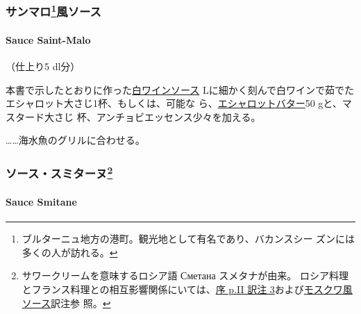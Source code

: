 \begin{recette}
\hypertarget{ux30b5ux30f3ux30deux30ed126ux98a8ux30bdux30fcux30b9}{%
\subsubsection[サンマロ風ソース]{\texorpdfstring{サンマロ\footnote{ブルターニュ地方の港町。観光地として有名であり、バカンスシー
  ズンには多くの人が訪れる。}風ソース}{サンマロ風ソース}}\label{ux30b5ux30f3ux30deux30ed126ux98a8ux30bdux30fcux30b9}}

\hypertarget{sauce-saint-malo}{%
\paragraph{Sauce Saint-Malo}\label{sauce-saint-malo}}


（仕上り5 dl分）

本書で示したとおりに作った\protect\hyperlink{sauce-vin-blanc}{白ワインソース}\undemi{}
Lに細かく刻んで白ワインで茹でたエシャロット大さじ1杯、もしくは、可能な
ら、\protect\hyperlink{beurre-d-echalote}{エシャロットバター}50
gと、マスタード大さじ \undemi{}杯、アンチョビエッセンス少々を加える。

\ldots{}\ldots{}海水魚のグリルに合わせる。

\maeaki

\hypertarget{ux30bdux30fcux30b9ux30b9ux30dfux30bfux30fcux30cc127}{%
\subsubsection[ソース・スミターヌ]{\texorpdfstring{ソース・スミターヌ\footnote{サワークリームを意味するロシア語
  Сметана スメタナが由来。
  ロシア料理とフランス料理との相互影響関係にいては、\protect\hyperlink{service-russe}{序
  p.II 訳注
  3}および\protect\hyperlink{sauce-moscovite}{モスクワ風ソース}訳注参
  照。}}{ソース・スミターヌ}}\label{ux30bdux30fcux30b9ux30b9ux30dfux30bfux30fcux30cc127}}

\hypertarget{sauce-smitane}{%
\paragraph{Sauce Smitane}\label{sauce-smitane}}



\end{recette}
